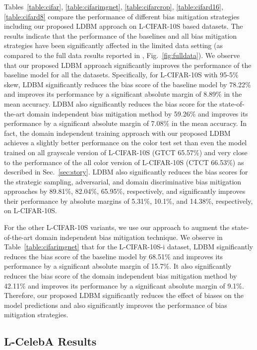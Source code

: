 \documentclass[10pt,twocolumn,letterpaper]{article}
\begin{document}
Tables~\ref{table:cifar}, \ref{table:cifarimgnet}, \ref{table:cifarcrop}, \ref{table:cifard16}, \ref{table:cifard8} compare the performance of different bias mitigation strategies including our proposed LDBM approach on L-CIFAR-10S based datasets. The results indicate that the performance of the baselines and all bias mitigation strategies have been significantly affected in the limited data setting (as compared to the full data results reported in \cite{wang2020towards}, Fig.~\ref{fig:fulldata}). We observe that our proposed LDBM approach significantly improves the performance of the baseline model for all the datasets. Specifically, for L-CIFAR-10S with 95-5\% skew, LDBM significantly reduces the bias score of the baseline model by 78.22\% and improves its performance by a significant absolute margin of 8.89\% in the mean accuracy. LDBM also significantly reduces the bias score for the state-of-the-art domain independent bias mitigation method by 59.26\% and improves its performance by a significant absolute margin of 7.08\% in the mean accuracy. In fact, the domain independent training approach with our proposed LDBM achieves a slightly better performance on the color test set than even the model trained on all grayscale version of L-CIFAR-10S (GTCT 65.57\%) and very close to the performance of the all color version of L-CIFAR-10S (CTCT 66.53\%) as described in Sec.~\ref{sec:story}. LDBM also significantly reduces the bias scores for the strategic sampling, adversarial, and domain discriminative bias mitigation approaches by 89.81\%, 82.04\%, 65.95\%, respectively, and significantly improves their performance by absolute margins of 5.31\%, 10.1\%, and 14.38\%, respectively, on L-CIFAR-10S.

For the other L-CIFAR-10S variants, we use our approach to augment the state-of-the-art domain independent bias mitigation technique. We observe in Table~\ref{table:cifarimgnet} that for the L-CIFAR-10S-i dataset, LDBM significantly reduces the bias score of the baseline model by 68.51\% and improves its performance by a significant absolute margin of 15.7\%. It also significantly reduces the bias score of the domain independent bias mitigation method by 42.11\% and improves its performance by a significant absolute margin of 9.1\%. Therefore, our proposed LDBM significantly reduces the effect of biases on the model predictions and also significantly improves the performance of bias mitigation strategies.




\subsection{L-CelebA Results}
\end{document}
